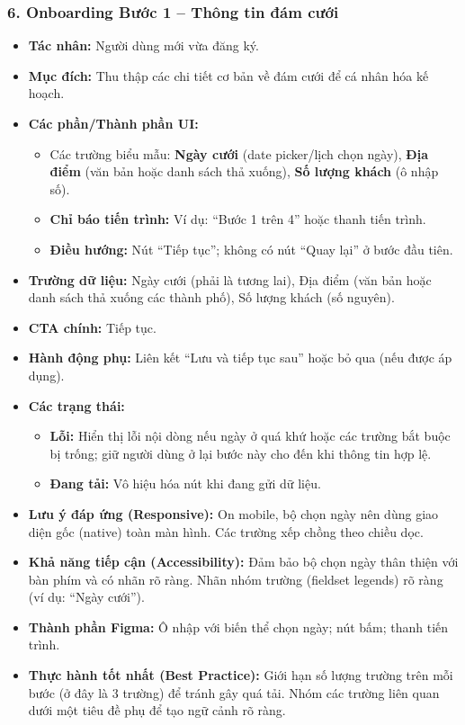 \documentclass[11pt,a4paper]{article}
\begin{document}
\subsubsection{6. Onboarding Bước 1 – Thông tin đám cưới}
\begin{itemize}
    \item \textbf{Tác nhân:} Người dùng mới vừa đăng ký.
    \item \textbf{Mục đích:} Thu thập các chi tiết cơ bản về đám cưới để cá nhân hóa kế hoạch.
    \item \textbf{Các phần/Thành phần UI:}
    \begin{itemize}
        \item Các trường biểu mẫu: \textbf{Ngày cưới} (date picker/lịch chọn ngày), \textbf{Địa điểm} (văn bản hoặc danh sách thả xuống), \textbf{Số lượng khách} (ô nhập số).
        \item \textbf{Chỉ báo tiến trình:} Ví dụ: ``Bước 1 trên 4'' hoặc thanh tiến trình.
        \item \textbf{Điều hướng:} Nút ``Tiếp tục''; không có nút ``Quay lại'' ở bước đầu tiên.
    \end{itemize}
    \item \textbf{Trường dữ liệu:} Ngày cưới (phải là tương lai), Địa điểm (văn bản hoặc danh sách thả xuống các thành phố), Số lượng khách (số nguyên).
    \item \textbf{CTA chính:} Tiếp tục.
    \item \textbf{Hành động phụ:} Liên kết ``Lưu và tiếp tục sau'' hoặc bỏ qua (nếu được áp dụng).
    \item \textbf{Các trạng thái:}
    \begin{itemize}
        \item \textbf{Lỗi:} Hiển thị lỗi nội dòng nếu ngày ở quá khứ hoặc các trường bắt buộc bị trống; giữ người dùng ở lại bước này cho đến khi thông tin hợp lệ.
        \item \textbf{Đang tải:} Vô hiệu hóa nút khi đang gửi dữ liệu.
    \end{itemize}
    \item \textbf{Lưu ý đáp ứng (Responsive):} On mobile, bộ chọn ngày nên dùng giao diện gốc (native) toàn màn hình. Các trường xếp chồng theo chiều dọc.
    \item \textbf{Khả năng tiếp cận (Accessibility):} Đảm bảo bộ chọn ngày thân thiện với bàn phím và có nhãn rõ ràng. Nhãn nhóm trường (fieldset legends) rõ ràng (ví dụ: ``Ngày cưới'').
    \item \textbf{Thành phần Figma:} Ô nhập với biến thể chọn ngày; nút bấm; thanh tiến trình.
    \item \textbf{Thực hành tốt nhất (Best Practice):} Giới hạn số lượng trường trên mỗi bước (ở đây là 3 trường) để tránh gây quá tải. Nhóm các trường liên quan dưới một tiêu đề phụ để tạo ngữ cảnh rõ ràng.
\end{itemize}
\end{document}
